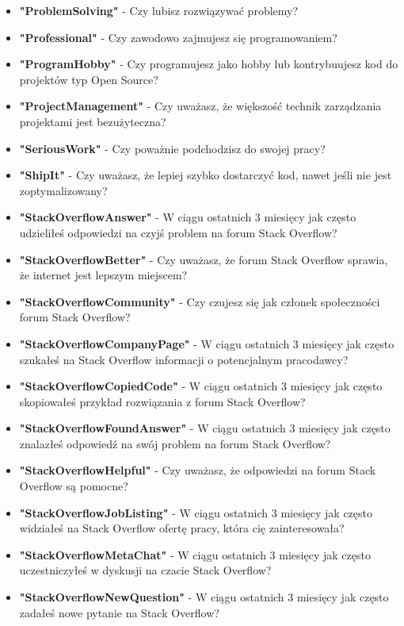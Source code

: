 \begin{appendices}
\begin{itemize}
        \item \textbf{"ProblemSolving"} - Czy lubisz rozwiązywać problemy?
        \item \textbf{"Professional"} - Czy zawodowo zajmujesz się programowaniem?
        \item \textbf{"ProgramHobby"} - Czy programujesz jako hobby lub kontrybuujesz kod do projektów typ Open Source?
        \item \textbf{"ProjectManagement"} - Czy uważasz, że większość technik zarządzania projektami jest bezużyteczna?
        \item \textbf{"SeriousWork"} - Czy poważnie podchodzisz do swojej pracy?
        \item \textbf{"ShipIt"} - Czy uważasz, że lepiej szybko dostarczyć kod, nawet jeśli nie jest zoptymalizowany?
        \item \textbf{"StackOverflowAnswer"} - W ciągu ostatnich 3 miesięcy jak często udzieliłeś odpowiedzi na czyjś problem na forum Stack Overflow?
        \item \textbf{"StackOverflowBetter"} - Czy uważasz, że forum Stack Overflow sprawia, że internet jest lepszym miejscem?
        \item \textbf{"StackOverflowCommunity"} - Czy czujesz się jak członek społeczności forum Stack Overflow?
        \item \textbf{"StackOverflowCompanyPage"} - W ciągu ostatnich 3 miesięcy jak często szukałeś na Stack Overflow informacji o potencjalnym pracodawcy?
        \item \textbf{"StackOverflowCopiedCode"} - W ciągu ostatnich 3 miesięcy jak często skopiowałeś przykład rozwiązania z forum Stack Overflow?
        \item \textbf{"StackOverflowFoundAnswer"} - W ciągu ostatnich 3 miesięcy jak często znalazłeś odpowiedź na swój problem na forum Stack Overflow?
        \item \textbf{"StackOverflowHelpful"} - Czy uważasz, że odpowiedzi na forum Stack Overflow są pomocne?
        \item \textbf{"StackOverflowJobListing"} - W ciągu ostatnich 3 miesięcy jak często widziałeś na Stack Overflow ofertę pracy, która cię zainteresowała?
        \item \textbf{"StackOverflowMetaChat"} - W ciągu ostatnich 3 miesięcy jak często uczestniczyłeś w dyskusji na czacie Stack Overflow?
        \item \textbf{"StackOverflowNewQuestion"} - W ciągu ostatnich 3 miesięcy jak często zadałeś nowe pytanie na Stack Overflow?

\end{itemize}
\end{appendices}
